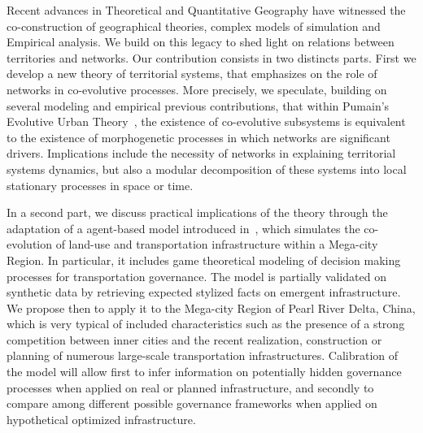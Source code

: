 Recent advances in Theoretical and Quantitative Geography have witnessed the co-construction of geographical theories, complex models of simulation and Empirical analysis. We build on this legacy to shed light on relations between territories and networks. Our contribution consists in two distincts parts. First we develop a new theory of territorial systems, that emphasizes on the role of networks in co-evolutive processes. More precisely, we speculate, building on several modeling and empirical previous contributions, that within Pumain's Evolutive Urban Theory~\cite{pumain1997pour}, the existence of co-evolutive subsystems is equivalent to the existence of morphogenetic processes in which networks are significant drivers. Implications include the necessity of networks in explaining territorial systems dynamics, but also a modular decomposition of these systems into local stationary processes in space or time.

In a second part, we discuss practical implications of the theory through the adaptation of a agent-based model introduced in~\cite{le2015modeling}, which simulates the co-evolution of land-use and transportation infrastructure within a Mega-city Region. In particular, it includes game theoretical modeling of decision making processes for transportation governance. The model is partially validated on synthetic data by retrieving expected stylized facts on emergent infrastructure. We propose then to apply it to the Mega-city Region of Pearl River Delta, China, which is very typical of included characteristics such as the presence of a strong competition between inner cities and the recent realization, construction or planning of numerous large-scale transportation infrastructures. Calibration of the model will allow first to infer information on potentially hidden governance processes when applied on real or planned infrastructure, and secondly to compare among different possible governance frameworks when applied on hypothetical optimized infrastructure.



\bigskip
\bigskip












